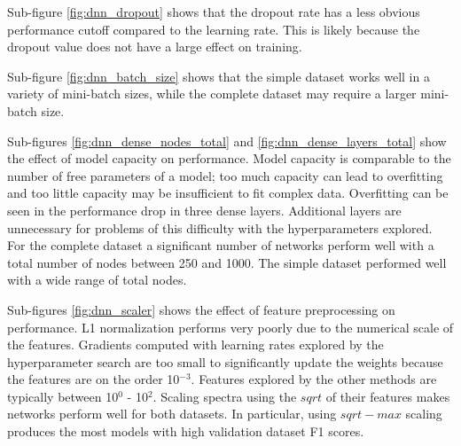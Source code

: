 Sub-figure \ref{fig:dnn_dropout} shows that the dropout rate has a less obvious performance cutoff compared to the learning rate. This is likely because the dropout value does not have a large effect on training.

Sub-figure \ref{fig:dnn_batch_size} shows that the simple dataset works well in a variety of mini-batch sizes, while the complete dataset may require a larger mini-batch size.

Sub-figures \ref{fig:dnn_dense_nodes_total} and \ref{fig:dnn_dense_layers_total} show the effect of model capacity on performance. Model capacity is comparable to the number of free parameters of a model; too much capacity can lead to overfitting and too little capacity may be insufficient to fit complex data. Overfitting can be seen in the performance drop in three dense layers. Additional layers are unnecessary for problems of this difficulty with the hyperparameters explored. For the complete dataset a significant number of networks perform well with a total number of nodes between 250 and 1000. The simple dataset performed well with a wide range of total nodes.

Sub-figures \ref{fig:dnn_scaler} shows the effect of feature preprocessing on performance. L1 normalization performs very poorly due to the numerical scale of the features. Gradients computed with learning rates explored by the hyperparameter search are too small to significantly update the weights because the features are on the order 10$^{-3}$. Features explored by the other methods are typically between 10$^{0}$ - 10$^{2}$. Scaling spectra using the $sqrt$ of their features makes networks perform well for both datasets. In particular, using $sqrt-max$ scaling produces the most models with high validation dataset F1 scores.

\newcommand{\bluecircle}{\raisebox{2pt}{\tikz{\filldraw[color=blue!60, fill=blue!60, very thick] circle (1.5mm);}}}

